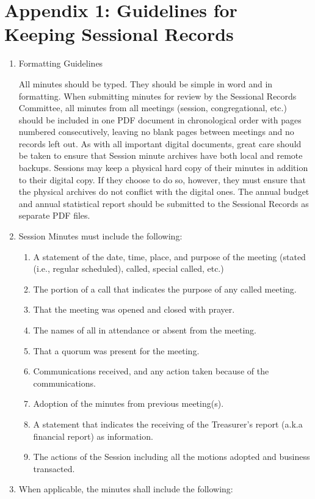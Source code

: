\documentclass[
]{book}
\providecommand{\tightlist}{%
  \setlength{\itemsep}{0pt}\setlength{\parskip}{0pt}}
\begin{document}
\hypertarget{appendix-1-guidelines-for-keeping-sessional-records}{%
\section*{Appendix 1: Guidelines for Keeping Sessional Records}\label{appendix-1-guidelines-for-keeping-sessional-records}}

\begin{enumerate}
\def\labelenumi{\Alph{enumi}.}
\item
  Formatting Guidelines

  All minutes should be typed. They should be simple in word and in formatting. When submitting minutes for review by the Sessional Records Committee, all minutes from all meetings (session, congregational, etc.) should be included in one PDF document in chronological order with pages numbered consecutively, leaving no blank pages between meetings and no records left out. As with all important digital documents, great care should be taken to ensure that Session minute archives have both local and remote backups. Sessions may keep a physical hard copy of their minutes in addition to their digital copy. If they choose to do so, however, they must ensure that the physical archives do not conflict with the digital ones. The annual budget and annual statistical report should be submitted to the Sessional Records as separate PDF files.
\item
  Session Minutes must include the following:

  \begin{enumerate}
  \def\labelenumii{\arabic{enumii}.}
  \tightlist
  \item
    A statement of the date, time, place, and purpose of the meeting (stated (i.e., regular scheduled), called, special called, etc.)
  \item
    The portion of a call that indicates the purpose of any called meeting.
  \item
    That the meeting was opened and closed with prayer.
  \item
    The names of all in attendance or absent from the meeting.
  \item
    That a quorum was present for the meeting.
  \item
    Communications received, and any action taken because of the communications.
  \item
    Adoption of the minutes from previous meeting(s).
  \item
    A statement that indicates the receiving of the Treasurer's report (a.k.a financial report) as information.
  \item
    The actions of the Session including all the motions adopted and business transacted.
  \end{enumerate}
\item
  When applicable, the minutes shall include the following:


\end{enumerate}
\end{document}

